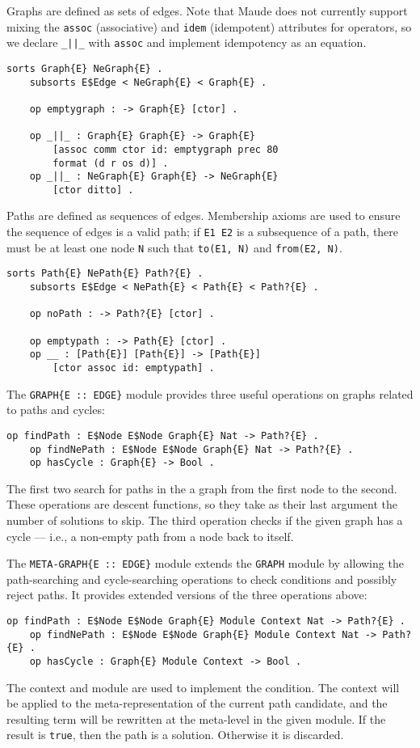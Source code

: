 \documentclass[11pt]{article}
\begin{document}
Graphs are defined as sets of edges. Note that Maude does not currently support
mixing the \lstinline|assoc| (associative) and \lstinline|idem| (idempotent)
attributes for operators, so we declare \lstinline!_||_! with \lstinline|assoc|
and implement idempotency as an equation.
\begin{lstlisting}[language=Maude, style=smalllisting]
    sorts Graph{E} NeGraph{E} .
    subsorts E$Edge < NeGraph{E} < Graph{E} .

    op emptygraph : -> Graph{E} [ctor] .

    op _||_ : Graph{E} Graph{E} -> Graph{E}
        [assoc comm ctor id: emptygraph prec 80
        format (d r os d)] .
    op _||_ : NeGraph{E} Graph{E} -> NeGraph{E}
        [ctor ditto] .
\end{lstlisting}

Paths are defined as sequences of edges. Membership axioms are used to ensure
the sequence of edges is a valid path; if \lstinline|E1 E2| is a subsequence of
a path, there must be at least one node \lstinline|N| such that
\lstinline|to(E1, N)| and \lstinline|from(E2, N)|.
\begin{lstlisting}[language=Maude, style=smalllisting]
    sorts Path{E} NePath{E} Path?{E} .
    subsorts E$Edge < NePath{E} < Path{E} < Path?{E} .

    op noPath : -> Path?{E} [ctor] .

    op emptypath : -> Path{E} [ctor] .
    op __ : [Path{E}] [Path{E}] -> [Path{E}]
        [ctor assoc id: emptypath] .
\end{lstlisting}

The \lstinline|GRAPH{E :: EDGE}| module provides three useful operations on
graphs related to paths and cycles:
\begin{lstlisting}[language=Maude, style=smalllisting]
    op findPath : E$Node E$Node Graph{E} Nat -> Path?{E} .
    op findNePath : E$Node E$Node Graph{E} Nat -> Path?{E} .
    op hasCycle : Graph{E} -> Bool .
\end{lstlisting}
The first two search for paths in the a graph from the first node to the second.
These operations are descent functions, so they take as their last argument the
number of solutions to skip. The third operation checks if the given graph has
a cycle --- i.e., a non-empty path from a node back to itself.

The \lstinline|META-GRAPH{E :: EDGE}| module extends the \lstinline|GRAPH|
module by allowing the path-searching and cycle-searching operations to check
conditions and possibly reject paths. It provides extended versions of the
three operations above:
\begin{lstlisting}[language=Maude, style=smalllisting]
    op findPath : E$Node E$Node Graph{E} Module Context Nat -> Path?{E} .
    op findNePath : E$Node E$Node Graph{E} Module Context Nat -> Path?{E} .
    op hasCycle : Graph{E} Module Context -> Bool .
\end{lstlisting}
The context and module are used to implement the condition. The context will be
applied to the meta-representation of the current path candidate, and the
resulting term will be rewritten at the meta-level in the given module. If the
result is \lstinline|true|, then the path is a solution. Otherwise it is
discarded.
\end{document}
